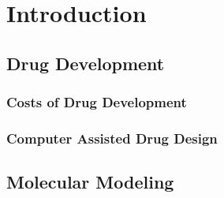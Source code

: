 \chapter{Introduction}
\label{chapter:intro}

\section{Drug Development}
\label{section:drug_development}

\subsection{Costs of Drug Development}
\label{subsection:costs_of_drug_development}


\subsection{Computer Assisted Drug Design}
\label{subsection:computer_assisted_drug_design}


\section{Molecular Modeling}
\label{section:molecular_modeling}


